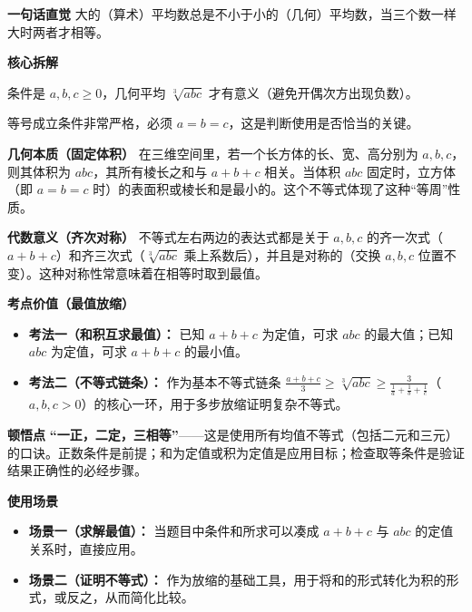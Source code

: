 \begin{explanationbox}
\textbf{\textcolor{CExplanation}{一句话直觉}}
大的（算术）平均数总是不小于小的（几何）平均数，当三个数一样大时两者才相等。

\medskip
\textbf{\textcolor{CExplanation}{核心拆解}}
\begin{description}[style=nextline, leftmargin=2.8em, labelsep=0.5em, itemsep=0.45em]
    \item[\textbf{要点一（非负前提）：}] 条件是 $a,b,c \ge 0$，几何平均 $\sqrt[3]{abc}$ 才有意义（避免开偶次方出现负数）。
    \item[\textbf{要点二（取等唯一）：}] 等号成立条件非常严格，必须 $a=b=c$，这是判断使用是否恰当的关键。
\end{description}

\medskip
\textbf{\textcolor{CExplanation}{几何本质（固定体积）}}
在三维空间里，若一个长方体的长、宽、高分别为 $a,b,c$，则其体积为 $abc$，其所有棱长之和与 $a+b+c$ 相关。当体积 $abc$ 固定时，立方体（即 $a=b=c$ 时）的表面积或棱长和是最小的。这个不等式体现了这种“等周”性质。

\medskip
\textbf{\textcolor{CExplanation}{代数意义（齐次对称）}}
不等式左右两边的表达式都是关于 $a,b,c$ 的齐一次式（$a+b+c$）和齐三次式（$\sqrt[3]{abc}$ 乘上系数后），并且是对称的（交换 $a,b,c$ 位置不变）。这种对称性常意味着在相等时取到最值。

\medskip
\textbf{\textcolor{CExplanation}{考点价值（最值放缩）}}
\begin{itemize}[leftmargin=*, itemsep=0.5em, topsep=0.4em]
    \item \textbf{考法一（和积互求最值）：} 已知 $a+b+c$ 为定值，可求 $abc$ 的最大值；已知 $abc$ 为定值，可求 $a+b+c$ 的最小值。
    \item \textbf{考法二（不等式链条）：} 作为基本不等式链条 $\frac{a+b+c}{3} \ge \sqrt[3]{abc} \ge \frac{3}{\frac{1}{a}+\frac{1}{b}+\frac{1}{c}}$（$a,b,c>0$）的核心一环，用于多步放缩证明复杂不等式。
\end{itemize}

\medskip
\textbf{\textcolor{CExplanation}{顿悟点}}
\textbf{“一正，二定，三相等”}——这是使用所有均值不等式（包括二元和三元）的口诀。正数条件是前提；和为定值或积为定值是应用目标；检查取等条件是验证结果正确性的必经步骤。

\medskip
\textbf{\textcolor{CExplanation}{使用场景}}
\begin{itemize}[leftmargin=*, itemsep=0.5em, topsep=0.4em]
    \item \textbf{场景一（求解最值）：} 当题目中条件和所求可以凑成 $a+b+c$ 与 $abc$ 的定值关系时，直接应用。
    \item \textbf{场景二（证明不等式）：} 作为放缩的基础工具，用于将和的形式转化为积的形式，或反之，从而简化比较。
\end{itemize}
\end{explanationbox}
